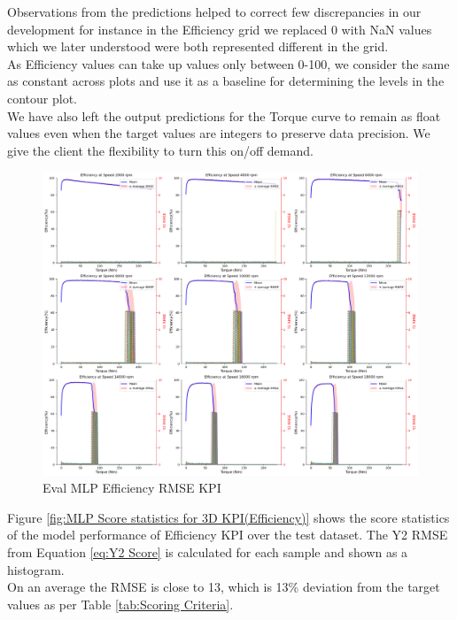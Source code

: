 \documentclass{report} %
\begin{document}
Observations from the predictions helped to correct few discrepancies in our development for instance in the Efficiency grid we replaced 0 with \ac{NaN} values which we later understood were both represented different in the grid.\\
As Efficiency values can take up values only between 0-100, we consider the same as constant across plots and use it as a baseline for determining the levels in the contour plot. \\ 
We have also left the output predictions for the Torque curve to remain as float values even when the target values are integers to preserve data precision. We give the client the flexibility to turn this on/off demand. \\

\begin{figure}[H]
    \centering
    \includegraphics[width=1\textwidth]{./ReportImages/rmse_eta_MLP.png} 
    \caption{Eval MLP Efficiency \ac{RMSE} \ac{KPI}} 
    \label{fig:Eval MLP Efficiency RMSE KPI}
\end{figure}

Figure \ref{fig:MLP Score statistics for 3D KPI(Efficiency)} shows the score statistics of the model performance of Efficiency \ac{KPI} over the test dataset.
The Y2 \ac{RMSE} from Equation \ref{eq:Y2 Score} is calculated for each sample and shown as a histogram.\\
On an average the \ac{RMSE} is close to 13, which is 13\% deviation from the target values as per Table \ref{tab:Scoring Criteria}.\\
\end{document}

